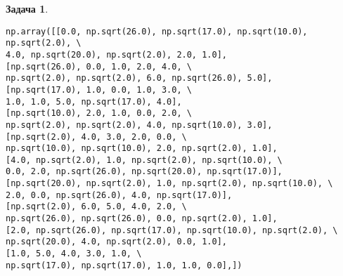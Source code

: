 \documentclass[12pt,fleqn]{article}
\newtheorem{esProblem}{Задача}
\begin{document}
\begin{esProblem}
\begin{verbatim}
np.array([[0.0, np.sqrt(26.0), np.sqrt(17.0), np.sqrt(10.0), np.sqrt(2.0), \
4.0, np.sqrt(20.0), np.sqrt(2.0), 2.0, 1.0],
[np.sqrt(26.0), 0.0, 1.0, 2.0, 4.0, \
np.sqrt(2.0), np.sqrt(2.0), 6.0, np.sqrt(26.0), 5.0],
[np.sqrt(17.0), 1.0, 0.0, 1.0, 3.0, \
1.0, 1.0, 5.0, np.sqrt(17.0), 4.0],
[np.sqrt(10.0), 2.0, 1.0, 0.0, 2.0, \
np.sqrt(2.0), np.sqrt(2.0), 4.0, np.sqrt(10.0), 3.0],
[np.sqrt(2.0), 4.0, 3.0, 2.0, 0.0, \
np.sqrt(10.0), np.sqrt(10.0), 2.0, np.sqrt(2.0), 1.0],
[4.0, np.sqrt(2.0), 1.0, np.sqrt(2.0), np.sqrt(10.0), \
0.0, 2.0, np.sqrt(26.0), np.sqrt(20.0), np.sqrt(17.0)],
[np.sqrt(20.0), np.sqrt(2.0), 1.0, np.sqrt(2.0), np.sqrt(10.0), \
2.0, 0.0, np.sqrt(26.0), 4.0, np.sqrt(17.0)],
[np.sqrt(2.0), 6.0, 5.0, 4.0, 2.0, \
np.sqrt(26.0), np.sqrt(26.0), 0.0, np.sqrt(2.0), 1.0],
[2.0, np.sqrt(26.0), np.sqrt(17.0), np.sqrt(10.0), np.sqrt(2.0), \
np.sqrt(20.0), 4.0, np.sqrt(2.0), 0.0, 1.0],
[1.0, 5.0, 4.0, 3.0, 1.0, \
np.sqrt(17.0), np.sqrt(17.0), 1.0, 1.0, 0.0],])
\end{verbatim}

\end{esProblem}
\end{document}
